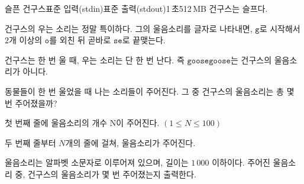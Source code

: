 \begin{problem}{슬픈 건구스}{표준 입력(stdin)}{표준 출력(stdout)}{1\,초}{512\,MB}
건구스는 슬프다.

건구스의 우는 소리는 정말 특이하다. 그의 울음소리를 글자로 나타내면, $\texttt{g}$로 시작해서 $2$개 이상의 $\texttt{o}$를 외친 뒤 곧바로 $\texttt{se}$로 끝맺는다.

건구스는 한 번 울 때, 우는 소리는 단 한 번 난다. 즉 $\texttt{goosegoose}$는 건구스의 울음소리가 아니다.

동물들이 한 번 울었을 때 나는 소리들이 주어진다. 그 중 건구스의 울음소리는 총 몇 번 주어졌을까?

\InputFile
첫 번째 줄에 울음소리의 개수 N이 주어진다. $(1 \le N \le 100)$

두 번째 줄부터 $N$개의 줄에 걸쳐, 울음소리가 주어진다. 

울음소리는 알파벳 소문자로 이루어져 있으며, 길이는 $1\,000$ 이하이다.
\OutputFile
주어진 울음소리 중, 건구스의 울음소리가 몇 번 주어졌는지 출력한다.
\Examples

\begin{example}
%
\end{example}

\end{problem}
